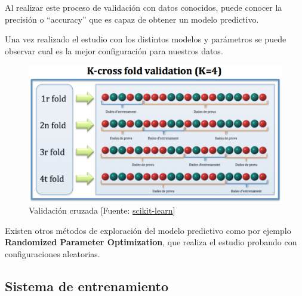 	Al realizar este proceso de validación con datos conocidos, puede conocer la precisión o ``accuracy'' que es capaz de obtener un modelo predictivo.

	Una vez realizado el estudio con los distintos modelos y parámetros se puede observar cual es la mejor configuración para nuestros datos.

	\begin{figure}[htb]
		\begin{center}
			\includegraphics[width=4.5in]{figures/Cross-Validation.jpg}
			\caption{Validación cruzada [Fuente: \href{www.scikit-learn.org}{scikit-learn}]}
		\end{center}
		\label{cross}
	\end{figure}
	
	Existen otros métodos de exploración del modelo predictivo como por ejemplo \textbf{Randomized Parameter Optimization}, que realiza el estudio probando con configuraciones aleatorias.

	\subsection{Sistema de entrenamiento}
	
